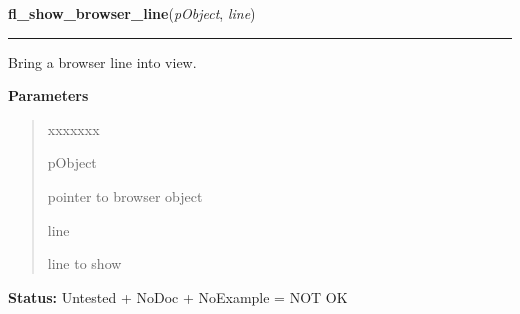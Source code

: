 \hspace{.8\funcindent}\begin{boxedminipage}{\funcwidth}

    \raggedright \textbf{fl\_show\_browser\_line}(\textit{pObject}, \textit{line})

    \vspace{-1.5ex}

    \rule{\textwidth}{0.5\fboxrule}
\setlength{\parskip}{2ex}
    Bring a browser line into view.

\setlength{\parskip}{1ex}
      \textbf{Parameters}
      \vspace{-1ex}

      \begin{quote}
        \begin{Ventry}{xxxxxxx}

          \item[pObject]

          pointer to browser object

          \item[line]

          line to show

        \end{Ventry}

      \end{quote}

\textbf{Status:} Untested + NoDoc + NoExample = NOT OK



    \end{boxedminipage}

    \label{xformslib:library:fl_set_default_browser_maxlinelength}

    \vspace{0.5ex}


